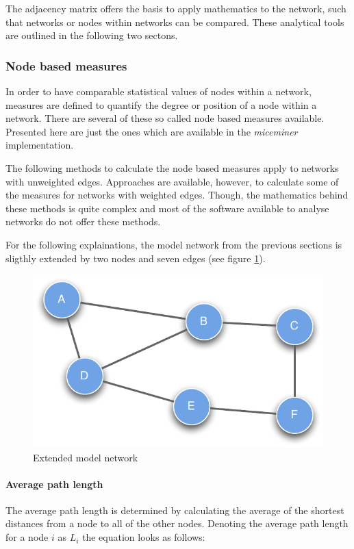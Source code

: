The adjacency matrix offers the basis to apply mathematics to the network, such that networks or nodes within networks can be compared. These analytical tools are outlined in the following two sectons.

\subsubsection{Node based measures}
\label{subsubsec:node_based}

In order to have comparable statistical values of nodes within a network, measures are defined to quantify the degree or position of a node within a network. There are several of these so called node based measures available. Presented here are just the ones which are available in the \textit{miceminer} implementation.

The following methods to calculate the node based measures apply to networks with unweighted edges. Approaches are available, however, to calculate some of the measures for networks with weighted edges. Though, the mathematics behind these methods is quite complex and most of the software available to analyse networks do not offer these methods.

For the following explainations, the model network from the previous sections is sligthly extended by two nodes and seven edges (see figure \ref{fig:extended_network}).

\begin{figure}[!htpb]
\begin{center}
  \includegraphics[width=.33\textwidth]{assets/pdf/graph_undirected_node_based.pdf}
  \caption{Extended model network}
  \label{fig:extended_network}
\end{center}
\end{figure}    

\paragraph{Average path length}

The average path length is determined by calculating the average of the shortest distances from a node to all of the other nodes. Denoting the average path length for a node $i$ as $L_i$ the equation looks as follows:

